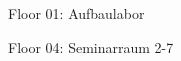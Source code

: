 \documentclass[a4paper]{article}
\begin{document}
\begin{center}
\begin{vsltext}{2cm}{2.4cm}

   \vspace{2.5cm}

    Floor 01: Aufbaulabor\\
    
    \vspace{1cm}

    Floor 04: Seminarraum 2-7\\
\end{vsltext}

\end{center}
\end{document}
